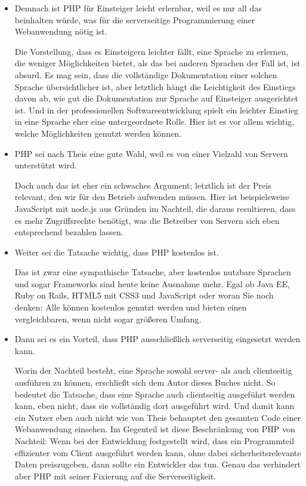 \begin{itemize}
	
	\item Demnach ist PHP für Einsteiger leicht erlernbar, weil es nur all das beinhalten würde, was für die serverseitige Programmierung einer Webanwendung nötig ist.
	
	Die Vorstellung, dass es Einsteigern leichter fällt, eine Sprache zu erlernen, die weniger Möglichkeiten bietet, als das bei anderen Sprachen der Fall ist, ist absurd. Es mag sein, dass die vollständige Dokumentation einer solchen Sprache übersichtlicher ist, aber letztlich hängt die Leichtigkeit des Einstiegs davon ab, wie gut die Dokumentation zur Sprache auf Einsteiger ausgerichtet ist. Und in der professionellen Softwareentwicklung spielt ein leichter Einstieg in eine Sprache eher eine untergeordnete Rolle. Hier ist es vor allem wichtig, welche Möglichkeiten genutzt werden können.
	
	\item PHP sei nach Theis eine gute Wahl, weil es von einer Vielzahl von Servern unterstützt wird.
	
	Doch auch das ist eher ein schwaches Argument; letztlich ist der Preis relevant, den wir für den Betrieb aufwenden müssen. Hier ist beispielsweise JavaScript mit node.js aus Gründen im Nachteil, die daraus resultieren, dass es mehr Zugriffsrechte benötigt, was die Betreiber von Servern sich eben entsprechend bezahlen lassen.
	
	\item Weiter sei die Tatsache wichtig, dass PHP kostenlos ist.
	
	Das ist zwar eine sympathische Tatsache, aber kostenlos nutzbare Sprachen und sogar Frameworks sind heute keine Ausnahme mehr. Egal ob Java EE, Ruby on Rails, HTML5 mit CSS3 und JavaScript oder woran Sie noch denken: Alle können kostenlos genutzt werden und bieten einen vergleichbaren, wenn nicht sogar größeren Umfang.
	
	\item Dann sei es ein Vorteil, dass PHP ausschließlich serverseitig eingesetzt werden kann.
	
	Worin der Nachteil besteht, eine Sprache sowohl server- als auch clientseitig ausführen zu können, erschließt sich dem Autor dieses Buches nicht. So bedeutet die Tatsache, dass eine Sprache auch clientseitig ausgeführt werden kann, eben nicht, dass sie vollständig dort ausgeführt wird. Und damit kann ein Nutzer eben auch nicht wie von Theis behauptet den gesamten Code einer Webanwendung einsehen. Im Gegenteil ist diese Beschränkung von PHP von Nachteil: Wenn bei der Entwicklung festgestellt wird, dass ein Programmteil effizienter vom Client ausgeführt werden kann, ohne dabei sicherheitsrelevante Daten preiszugeben, dann sollte ein Entwickler das tun. Genau das verhindert aber PHP mit seiner Fixierung auf die Serverseitigkeit.
\end{itemize}

